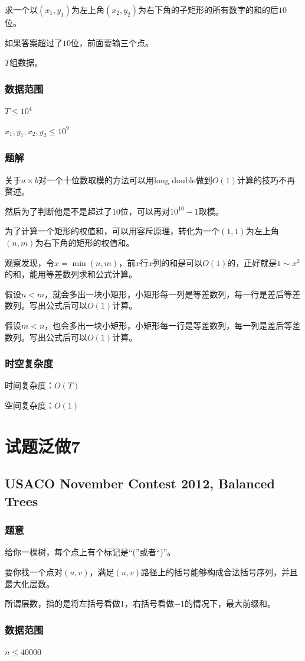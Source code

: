 \documentclass{ctexart}
\begin{document}
求一个以$(x_1,y_1)$为左上角$(x_2,y_2)$为右下角的子矩形的所有数字的和的后$10$位。

如果答案超过了$10$位，前面要输三个点。

$T$组数据。
\subsubsection{数据范围}
$T \le 10^4$

$x_1,y_1,x_2,y_2 \le 10^9$
\subsubsection{题解}
关于$a \times b$对一个十位数取模的方法可以用long double做到$O(1)$计算的技巧不再赘述。

然后为了判断他是不是超过了$10$位，可以再对$10^{10}-1$取模。

为了计算一个矩形的权值和，可以用容斥原理，转化为一个$(1,1)$为左上角$(n,m)$为右下角的矩形的权值和。

观察发现，令$x=\min(n,m)$，前$x$行$x$列的和是可以$O(1)$的，正好就是$1 \sim x^2$的和，能用等差数列求和公式计算。

假设$n<m$，就会多出一块小矩形，小矩形每一列是等差数列，每一行是差后等差数列。写出公式后可以$O(1)$计算。

假设$m<n$，也会多出一块小矩形，小矩形每一行是等差数列，每一列是差后等差数列。写出公式后可以$O(1)$计算。
\subsubsection{时空复杂度}
时间复杂度：$O(T)$

空间复杂度：$O(1)$
\newpage
\section{试题泛做7}
\subsection{USACO November Contest 2012, Balanced Trees}
\subsubsection{题意}
给你一棵树，每个点上有个标记是“(”或者“)”。

要你找一个点对$(u,v)$，满足$(u,v)$路径上的括号能够构成合法括号序列，并且最大化层数。

所谓层数，指的是将左括号看做$1$，右括号看做$-1$的情况下，最大前缀和。
\subsubsection{数据范围}
$n \le 40000$
\end{document}
